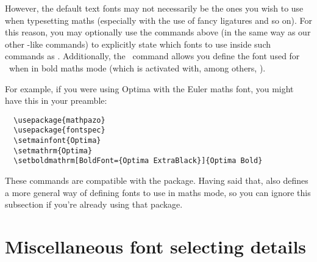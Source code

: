 
However, the default text fonts may not necessarily be the ones you
wish to use when typesetting maths (especially with the use of fancy
ligatures and so on). For this reason, you may optionally use the
commands above (in the same way as our other
\cmd\fontspec-like commands) to explicitly state which fonts to use
inside such commands as \cmd\mathrm. Additionally, the
\cmd\setboldmathrm\ command allows you define the font used for
\cmd\mathrm\ when in bold maths mode (which is activated with, among
others, \cmd\boldmath).

For example, if you were using Optima with the Euler maths font, you
might have this in your preamble:
\begin{Verbatim}
  \usepackage{mathpazo}
  \usepackage{fontspec}
  \setmainfont{Optima}
  \setmathrm{Optima}
  \setboldmathrm[BoldFont={Optima ExtraBlack}]{Optima Bold}
\end{Verbatim}
These commands are compatible with the  package.
Having said that,  also defines a more general way of defining fonts to use in maths mode, so you can ignore this subsection if you're already using that package.


\section{Miscellaneous font selecting details}

